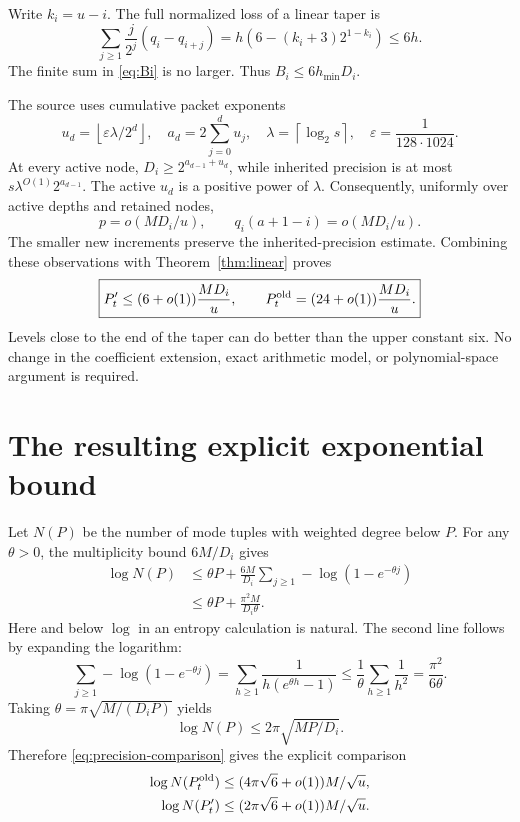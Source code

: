 \documentclass[11pt,letterpaper]{article}
\numberwithin{equation}{section}
\theoremstyle{definition}
\theoremstyle{remark}
\newcommand{\ceil}[1]{\left\lceil #1\right\rceil}
\newcommand{\floor}[1]{\left\lfloor #1\right\rfloor}
\begin{document}
Write $k_i=u-i$. The full normalized loss of a linear taper is
\begin{equation}
 \sum_{j\ge1}\frac{j}{2^j}(q_i-q_{i+j})
   =h\left(6-(k_i+3)2^{1-k_i}\right)\le6h.
 \label{eq:linear-loss}
\end{equation}
The finite sum in \eqref{eq:Bi} is no larger. Thus $B_i\le6h_{\min}D_i$.

The source uses cumulative packet exponents
\[
 u_d=\floor{\varepsilon\lambda/2^d},\quad
 a_d=2\sum_{j=0}^d u_j,\quad
 \lambda=\ceil{\log_2s},\quad
 \varepsilon=\frac1{128\cdot1024}.
\]
At every active node, $D_i\ge2^{a_{d-1}+u_d}$, while inherited precision is
at most $s\lambda^{O(1)}2^{a_{d-1}}$. The active $u_d$ is a positive
power of $\lambda$. Consequently, uniformly over active depths and retained
nodes,
\[
 p=o(MD_i/u),\qquad q_i(a+1-i)=o(MD_i/u).
\]
The smaller new increments preserve the inherited-precision estimate.
Combining these observations with Theorem~\ref{thm:linear} proves
\begin{equation}
 \boxed{P'_t\le(6+o(1))\frac{MD_i}{u},\qquad
 P_t^{\rm old}=(24+o(1))\frac{MD_i}{u}.}
 \label{eq:precision-comparison}
\end{equation}
Levels close to the end of the taper can do better than the upper constant
six. No change in the coefficient extension, exact arithmetic model, or
polynomial-space argument is required.

\section{The resulting explicit exponential bound}
\label{sec:global}

Let $N(P)$ be the number of mode tuples with weighted degree below $P$.
For any $\theta>0$, the multiplicity bound $6M/D_i$ gives
\begin{align}
 \log N(P)
 &\le\theta P+\frac{6M}{D_i}
                 \sum_{j\ge1}-\log(1-e^{-\theta j})\\
 &\le\theta P+\frac{\pi^2M}{D_i\theta}.
 \label{eq:entropy-bound}
\end{align}
Here and below $\log$ in an entropy calculation is natural. The second
line follows by expanding the logarithm:
\[
 \sum_{j\ge1}-\log(1-e^{-\theta j})
 =\sum_{h\ge1}\frac1{h(e^{\theta h}-1)}
 \le\frac1\theta\sum_{h\ge1}\frac1{h^2}
 =\frac{\pi^2}{6\theta}.
\]
Taking $\theta=\pi\sqrt{M/(D_iP)}$ yields
\begin{equation}
 \log N(P)\le2\pi\sqrt{MP/D_i}.\label{eq:optimized-entropy}
\end{equation}
Therefore \eqref{eq:precision-comparison} gives the explicit comparison
\begin{align}
 \log N(P_t^{\rm old})
   &\le(4\pi\sqrt6+o(1))M/\sqrt u,\\
 \log N(P'_t)
   &\le(2\pi\sqrt6+o(1))M/\sqrt u.
 \label{eq:mode-constant}
\end{align}
\end{document}
